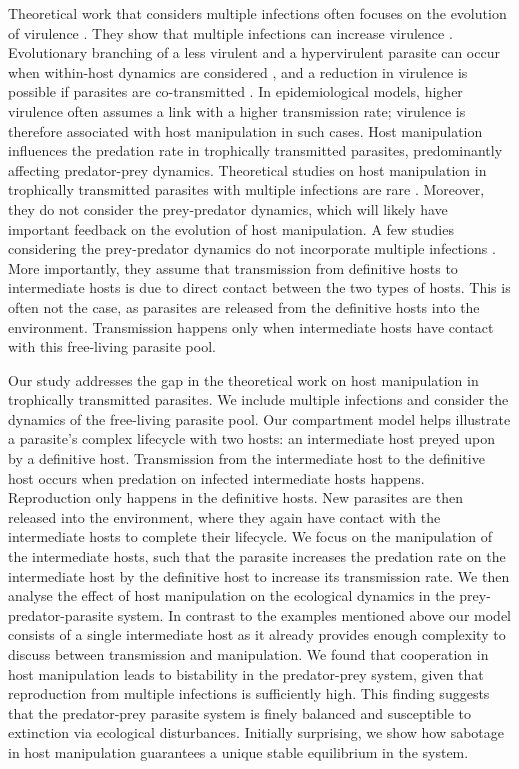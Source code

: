 \documentclass[11pt]{article}
\begin{document}
Theoretical work that considers multiple infections often focuses on the evolution of virulence \citep{vanBaalen1995, Alizon2013, Alizon2008, Choisy2010, Alizon2012}. 
They show that multiple infections can increase virulence \citep{vanBaalen1995, Choisy2010}.
Evolutionary branching of a less virulent and a hypervirulent parasite can occur when within-host dynamics are considered \citep{ Alizon2008}, and a reduction in virulence is possible if parasites are co-transmitted \citep{Alizon2012}. 
In epidemiological models, higher virulence often assumes a link with a higher transmission rate; virulence is therefore associated with host manipulation in such cases. 
Host manipulation influences the predation rate in trophically transmitted parasites, predominantly affecting predator-prey dynamics. 
Theoretical studies on host manipulation in trophically transmitted parasites with multiple infections are rare \citep{Parker2003,Vickery2009}. Moreover, they do not consider the prey-predator dynamics, which will likely have important feedback on the evolution of host manipulation. 
A few studies considering the prey-predator dynamics do not incorporate multiple infections \citep{Rogawa2018, Iritani2018, Hadeler1989, Fenton2006}. 
More importantly, they assume that transmission from definitive hosts to intermediate hosts is due to direct contact between the two types of hosts. 
This is often not the case, as parasites are released from the definitive hosts into the environment. 
Transmission happens only when intermediate hosts have contact with this free-living parasite pool.

Our study addresses the gap in the theoretical work on host manipulation in trophically transmitted parasites.
We include multiple infections and consider the dynamics of the free-living parasite pool. 
Our compartment model helps illustrate a parasite's complex lifecycle with two hosts: an intermediate host preyed upon by a definitive host. 
Transmission from the intermediate host to the definitive host occurs when predation on infected intermediate hosts happens. 
Reproduction only happens in the definitive hosts. 
New parasites are then released into the environment, where they again have contact with the intermediate hosts to complete their lifecycle. 
We focus on the manipulation of the intermediate hosts, such that the parasite increases the predation rate on the intermediate host by the definitive host to increase its transmission rate. 
We then analyse the effect of host manipulation on the ecological dynamics in the prey-predator-parasite system. 
In contrast to the examples mentioned above our model consists of a single intermediate host as it already provides enough complexity to discuss between transmission and manipulation.
We found that cooperation in host manipulation leads to bistability in the predator-prey system, given that reproduction from multiple infections is sufficiently high. 
This finding suggests that the predator-prey parasite system is finely balanced and susceptible to extinction via ecological disturbances.
Initially surprising, we show how sabotage in host manipulation guarantees a unique stable equilibrium in the system. 
\end{document}

